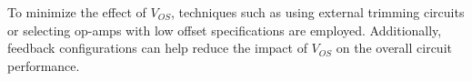 To minimize the effect of $V_{OS}$, techniques such as using external trimming circuits or selecting op-amps with low offset specifications are employed. Additionally, feedback configurations can help reduce the impact of $V_{OS}$ on the overall circuit performance.

